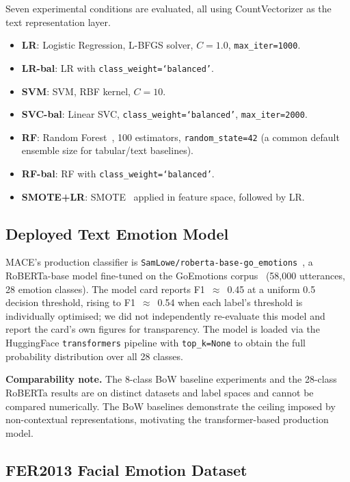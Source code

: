 \documentclass[conference]{IEEEtran}
\begin{document}
Seven experimental conditions are evaluated, all using
CountVectorizer as the text representation layer.

\begin{itemize}
    \item \textbf{LR}: Logistic Regression, L-BFGS solver,
          $C{=}1.0$, \texttt{max\_iter=1000}.
    \item \textbf{LR-bal}: LR with \texttt{class\_weight=`balanced'}.
    \item \textbf{SVM}: SVM, RBF kernel, $C{=}10$.
    \item \textbf{SVC-bal}: Linear SVC,
          \texttt{class\_weight=`balanced'},
          \texttt{max\_iter=2000}.
    \item \textbf{RF}: Random Forest~\cite{breiman2001rf},
          100 estimators, \texttt{random\_state=42} (a common
          default ensemble size for tabular/text baselines).
    \item \textbf{RF-bal}: RF with
          \texttt{class\_weight=`balanced'}.
    \item \textbf{SMOTE+LR}: SMOTE~\cite{chawla2002smote}
          applied in feature space, followed by LR.
\end{itemize}

\subsection{Deployed Text Emotion Model}

MACE's production classifier is
\texttt{SamLowe/roberta-base-go\_emotions}~\cite{samlow2022goemotions},
a RoBERTa-base model fine-tuned on the GoEmotions
corpus~\cite{demszky2020goemotions} (58,000 utterances,
28 emotion classes).
The model card reports F1~$\approx$~0.45 at a uniform 0.5
decision threshold, rising to F1~$\approx$~0.54 when each label's
threshold is individually optimised; we did not independently
re-evaluate this model and report the card's own figures for
transparency.
The model is loaded via the HuggingFace \texttt{transformers}
pipeline with \texttt{top\_k=None} to obtain the full
probability distribution over all 28 classes.

\textbf{Comparability note.}
The 8-class BoW baseline experiments and the 28-class RoBERTa
results are on distinct datasets and label spaces and cannot be
compared numerically.
The BoW baselines demonstrate the ceiling imposed by
non-contextual representations, motivating the transformer-based
production model.

\subsection{FER2013 Facial Emotion Dataset}
\label{sec:fer_setup}
\end{document}
